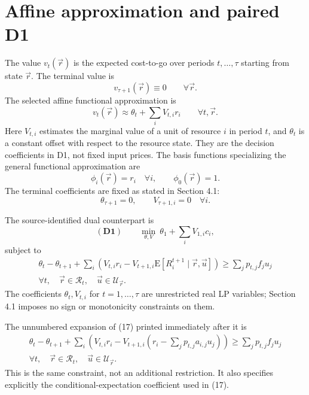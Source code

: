 \documentclass{article}
\begin{document}
\section*{Affine approximation and paired D1}

The value \(v_t(\vec r)\) is the expected cost-to-go over periods
\(t,\ldots,\tau\) starting from state \(\vec r\). The terminal value is
\[
v_{\tau+1}(\vec r)\equiv0\qquad\forall\vec r.
\]
The selected affine functional approximation is
\begin{equation}
v_t(\vec r)\approx\theta_t+\sum_i V_{t,i}r_i
\qquad\forall t,\vec r.
\tag{14}
\end{equation}
Here \(V_{t,i}\) estimates the marginal value of a unit of resource
\(i\) in period \(t\), and \(\theta_t\) is a constant offset with
respect to the resource state. They are the decision coefficients in
D1, not fixed input prices. The basis functions specializing the general
functional approximation are
\[
\phi_i(\vec r)=r_i\quad\forall i,
\qquad \phi_0(\vec r)=1.
\]
The terminal coefficients are fixed as stated in Section 4.1:
\[
\theta_{\tau+1}=0,\qquad V_{\tau+1,i}=0\quad\forall i.
\]

The source-identified dual counterpart is
\begin{equation}
(\mathbf{D1})\qquad
\min_{\theta,V}\ \theta_1+\sum_i V_{1,i}c_i,
\tag{16}
\end{equation}
subject to
\begin{equation}
\begin{split}
\theta_t-\theta_{t+1}
+\sum_i\left(V_{t,i}r_i
 -V_{t+1,i}\mathrm E[R_i^{t+1}\mid\vec r,\vec u]\right)
\geqslant\sum_j p_{t,j}f_j u_j\\
\forall t,\quad\vec r\in\mathscr R_t,\quad
\vec u\in\mathscr U_{\vec r}.
\end{split}
\tag{17}
\end{equation}
The coefficients \(\theta_t,V_{t,i}\) for \(t=1,\ldots,\tau\)
are unrestricted real LP variables; Section 4.1 imposes no sign or
monotonicity constraints on them.

The unnumbered expansion of (17) printed immediately after it is
\[
\begin{split}
\theta_t-\theta_{t+1}
+\sum_i\left(
V_{t,i}r_i-V_{t+1,i}
\left(r_i-\sum_j p_{t,j}a_{i,j}u_j\right)
\right)
\geqslant\sum_j p_{t,j}f_j u_j\\
\forall t,\quad\vec r\in\mathscr R_t,\quad
\vec u\in\mathscr U_{\vec r}.
\end{split}
\]
This is the same constraint, not an additional restriction. It also
specifies explicitly the conditional-expectation coefficient used
in (17).
\end{document}
